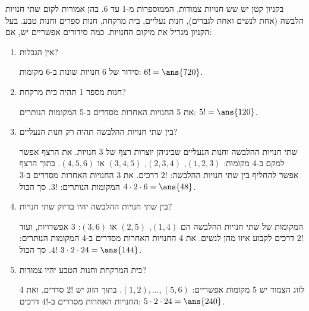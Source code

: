 בקניון קטן יש שש חנויות צמודות, הממוספרות מ-1 עד 6. בהן אמורות לקום שתי חנויות הלבשה (אחת לנשים ואחת לגברים), חנות נעליים, בית מרקחת, חנות ספרים וחנות טבע. בעל הקניון מגריל את מיקום החנויות. כמה סידורים אפשריים יש, אם:
\begin{enumerate}
\item אין הגבלות?
\begin{solbox}
סידור של 6 חנויות שונות ב-6 מקומות: $6!=\ans{720}$.
\end{solbox}
\item חנות מספר 1 תהיה בית מרקחת?
\begin{solbox}
את 5 החנויות האחרות מסדרים ב-5 המקומות הנותרים: $5!=\ans{120}$.
\end{solbox}
\item בין שתי חנויות ההלבשה תהיה רק חנות הנעליים?
\begin{solbox}
שתי חנויות ההלבשה וחנות הנעליים שביניהן יוצרות רצף של 3 חנויות. את הרצף אפשר למקם ב-4 מקומות: $(1,2,3)$, $(2,3,4)$, $(3,4,5)$ או $(4,5,6)$. בתוך הרצף אפשר להחליף בין שתי חנויות ההלבשה: $2!$ דרכים. את 3 החנויות האחרות מסדרים ב-3 המקומות הנותרים: $3!$. סך הכול $4\cdot2\cdot6=\ans{48}$.
\end{solbox}
\item בין שתי חנויות ההלבשה יהיו בדיוק שתי חנויות?
\begin{solbox}
המקומות של שתי חנויות ההלבשה הם $(1,4)$, $(2,5)$ או $(3,6)$: 3 אפשרויות, ועוד $2!$ דרכים לקבוע איזו מהן לנשים. את 4 החנויות האחרות מסדרים ב-4 המקומות הנותרים: $4!$. סך הכול $3\cdot2\cdot24=\ans{144}$.
\end{solbox}
\item בית המרקחת וחנות הטבע יהיו צמודות?
\begin{solbox}
לזוג הצמוד יש 5 מקומות אפשריים: $(1,2),\dots,(5,6)$. בתוך הזוג יש $2!$ סדרים, ואת 4 החנויות האחרות מסדרים ב-$4!$ דרכים: $5\cdot2\cdot24=\ans{240}$.
\end{solbox}
\end{enumerate}
